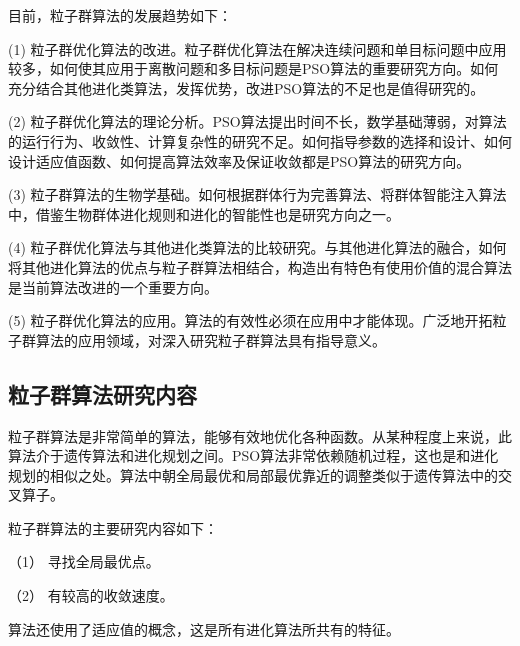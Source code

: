 目前，粒子群算法的发展趋势如下：


	\noindent (1) 粒子群优化算法的改进。粒子群优化算法在解决连续问题和单目标问题中应用较多，如何使其应用于离散问题和多目标问题是PSO算法的重要研究方向。如何充分结合其他进化类算法，发挥优势，改进PSO算法的不足也是值得研究的。
	
	\noindent (2) 粒子群优化算法的理论分析。PSO算法提出时间不长，数学基础薄弱，对算法的运行行为、收敛性、计算复杂性的研究不足。如何指导参数的选择和设计、如何设计适应值函数、如何提高算法效率及保证收敛都是PSO算法的研究方向。
	
	\noindent (3) 粒子群算法的生物学基础。如何根据群体行为完善算法、将群体智能注入算法中，借鉴生物群体进化规则和进化的智能性也是研究方向之一。
	
	\noindent (4) 粒子群优化算法与其他进化类算法的比较研究。与其他进化算法的融合，如何将其他进化算法的优点与粒子群算法相结合，构造出有特色有使用价值的混合算法是当前算法改进的一个重要方向。
	
	\noindent (5) 粒子群优化算法的应用。算法的有效性必须在应用中才能体现。广泛地开拓粒子群算法的应用领域，对深入研究粒子群算法具有指导意义。

	
\subsection{粒子群算法研究内容}
粒子群算法是非常简单的算法，能够有效地优化各种函数。从某种程度上来说，此算法介于遗传算法和进化规划之间。PSO算法非常依赖随机过程，这也是和进化规划的相似之处。算法中朝全局最优和局部最优靠近的调整类似于遗传算法中的交叉算子。

\noindent 粒子群算法的主要研究内容如下：

（1）	寻找全局最优点。

（2）	有较高的收敛速度。

算法还使用了适应值的概念，这是所有进化算法所共有的特征。

